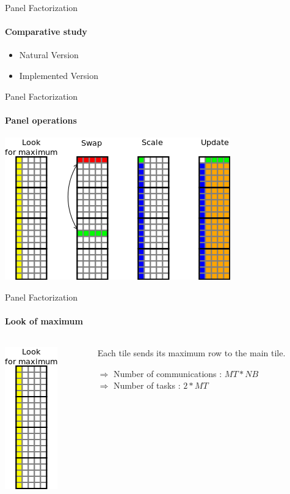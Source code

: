 
\begin{frame}{Panel Factorization}
\framesubtitle{Comparative study}
\begin{itemize}
\item Natural Version
\item Implemented Version
\end{itemize}
\end{frame}

\begin{frame}{Panel Factorization}
\framesubtitle{Panel operations}
\begin{center}
\includegraphics[scale=0.8]{panel_operation.png}
\end{center}
\end{frame}

\begin{frame}{Panel Factorization}
\framesubtitle{Look of maximum}
\begin{columns}
\begin{column}{.30\textwidth}
\begin{center}
\includegraphics[scale=0.8]{panel_max.png}
\end{center}
\end{column}
\hfill
\begin{column}{.70\textwidth}
Each tile sends its maximum row to the main tile.
\begin{center}
\begin{exampleblock}{}
$\Longrightarrow$ Number of communications : $MT*NB$\\
$\Longrightarrow$ Number of tasks : $2*MT$
\end{exampleblock}{}
\end{center}
\end{column}
\end{columns}
\end{frame}

